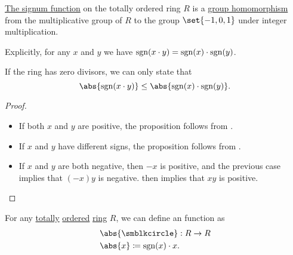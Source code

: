 \begin{proposition}\label{thm:def:totally_ordered_ring_signum}
  \hyperref[def:totally_ordered_ring_signum]{The signum function} on the totally ordered  ring \( R \) is a \hyperref[def:group/homomorphism]{group homomorphism} from the multiplicative group of \( R \) to the group \( \set{ -1, 0, 1 } \) under integer multiplication.

  Explicitly, for any \( x \) and \( y \) we have \( \operatorname{sgn}(x \cdot y) = \operatorname{sgn}(x) \cdot \operatorname{sgn}(y) \).

  If the ring has zero divisors, we can only state that
  \begin{equation*}
    \abs{\sgn(x \cdot y)} \leq \abs{\sgn(x) \cdot \sgn(y)}.
  \end{equation*}
\end{proposition}
\begin{proof}
  \begin{itemize}
    \item If both \( x \) and \( y \) are positive, the proposition follows from .
    \item If \( x \) and \( y \) have different signs, the proposition follows from .
    \item If \( x \) and \( y \) are both negative, then \( -x \) is positive, and the previous case implies that \( (-x)y \) is negative.  then implies that \( xy \) is positive.
  \end{itemize}
\end{proof}

\begin{definition}\label{def:totally_ordered_ring_absolute_value}\mimprovised
  For any \hyperref[def:totally_ordered_set]{totally} \hyperref[def:ordered_semiring]{ordered} \hyperref[def:ring]{ring} \( R \), we can define an  function as
  \begin{equation*}
    \begin{aligned}
      &\abs{\anon}: R \to R \\
      &\abs{x} \coloneqq \sgn(x) \cdot x.
    \end{aligned}
  \end{equation*}
\end{definition}

